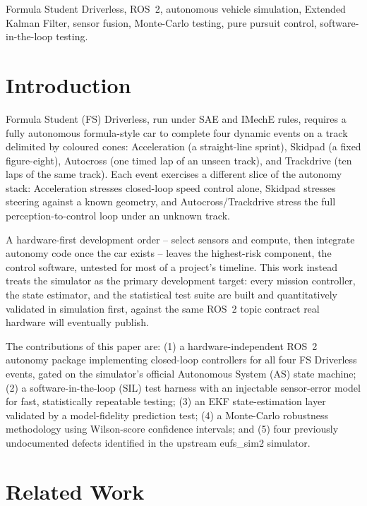 \documentclass[conference]{IEEEtran}
\begin{document}
\begin{IEEEkeywords}
Formula Student Driverless, ROS~2, autonomous vehicle simulation, Extended Kalman Filter, sensor fusion, Monte-Carlo testing, pure pursuit control, software-in-the-loop testing.
\end{IEEEkeywords}

\section{Introduction}

Formula Student (FS) Driverless, run under SAE and IMechE rules, requires a fully autonomous formula-style car to complete four dynamic events on a track delimited by coloured cones: Acceleration (a straight-line sprint), Skidpad (a fixed figure-eight), Autocross (one timed lap of an unseen track), and Trackdrive (ten laps of the same track). Each event exercises a different slice of the autonomy stack: Acceleration stresses closed-loop speed control alone, Skidpad stresses steering against a known geometry, and Autocross/Trackdrive stress the full perception-to-control loop under an unknown track.

A hardware-first development order -- select sensors and compute, then integrate autonomy code once the car exists -- leaves the highest-risk component, the control software, untested for most of a project's timeline. This work instead treats the simulator as the primary development target: every mission controller, the state estimator, and the statistical test suite are built and quantitatively validated in simulation first, against the same ROS~2 topic contract real hardware will eventually publish.

The contributions of this paper are: (1) a hardware-independent ROS~2 autonomy package implementing closed-loop controllers for all four FS Driverless events, gated on the simulator's official Autonomous System (AS) state machine; (2) a software-in-the-loop (SIL) test harness with an injectable sensor-error model for fast, statistically repeatable testing; (3) an EKF state-estimation layer validated by a model-fidelity prediction test; (4) a Monte-Carlo robustness methodology using Wilson-score confidence intervals; and (5) four previously undocumented defects identified in the upstream eufs\_sim2 simulator.

\section{Related Work}
\end{document}
